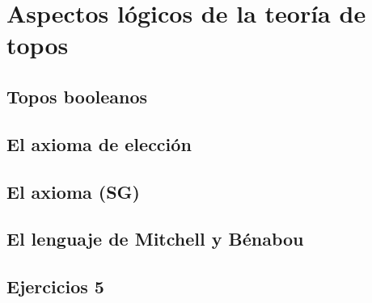 \chapter{Aspectos lógicos de la teoría de topos}
\label{cap:5}

\section{Topos booleanos}
\label{sec:5.1}

\section{El axioma de elección}
\label{sec:5.2}

\section{El axioma (SG)}
\label{sec:5.3}

\section{El lenguaje de Mitchell y Bénabou}
\label{sec:5.4}

\section*{Ejercicios 5}
\label{sec:ejercicios-5}
